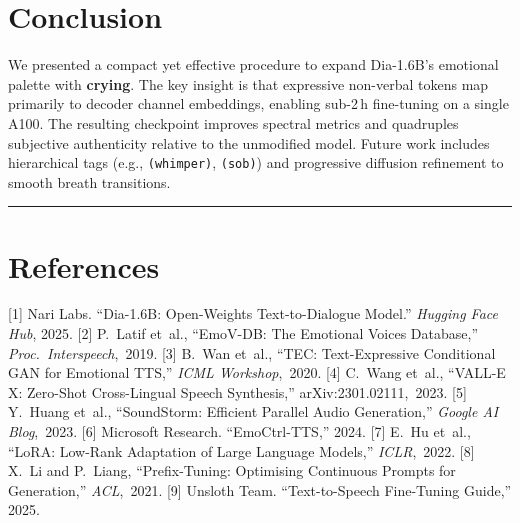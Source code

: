 \documentclass{article}
\begin{document}
\hypertarget{conclusion}{%
\section{Conclusion}\label{conclusion}}

We presented a compact yet effective procedure to expand Dia-1.6B's
emotional palette with \textbf{crying}. The key insight is that
expressive non-verbal tokens map primarily to decoder channel
embeddings, enabling sub-2\,h fine-tuning on a single A100. The
resulting checkpoint improves spectral metrics and quadruples subjective
authenticity relative to the unmodified model. Future work includes
hierarchical tags (e.g., \texttt{(whimper)}, \texttt{(sob)}) and
progressive diffusion refinement to smooth breath transitions.

\begin{center}\rule{0.5\linewidth}{0.5pt}\end{center}

\hypertarget{references}{%
\section*{References}\label{references}}

{[}1{]} Nari Labs. ``Dia-1.6B: Open-Weights Text-to-Dialogue Model.''
\emph{Hugging Face Hub}, 2025. {[}2{]} P.~Latif et~al., ``EmoV-DB: The
Emotional Voices Database,'' \emph{Proc.~Interspeech},~2019. {[}3{]}
B.~Wan et~al., ``TEC: Text-Expressive Conditional GAN for Emotional
TTS,'' \emph{ICML Workshop},~2020. {[}4{]} C.~Wang et~al., ``VALL-E X:
Zero-Shot Cross-Lingual Speech Synthesis,'' arXiv:2301.02111,~2023.
{[}5{]} Y.~Huang et~al., ``SoundStorm: Efficient Parallel Audio
Generation,'' \emph{Google AI Blog},~2023. {[}6{]} Microsoft Research.
``EmoCtrl-TTS,'' 2024. {[}7{]} E.~Hu et~al., ``LoRA: Low-Rank Adaptation
of Large Language Models,'' \emph{ICLR},~2022. {[}8{]} X.~Li and
P.~Liang, ``Prefix-Tuning: Optimising Continuous Prompts for
Generation,'' \emph{ACL},~2021. {[}9{]} Unsloth Team. ``Text-to-Speech
Fine-Tuning Guide,'' 2025.
\end{document}

